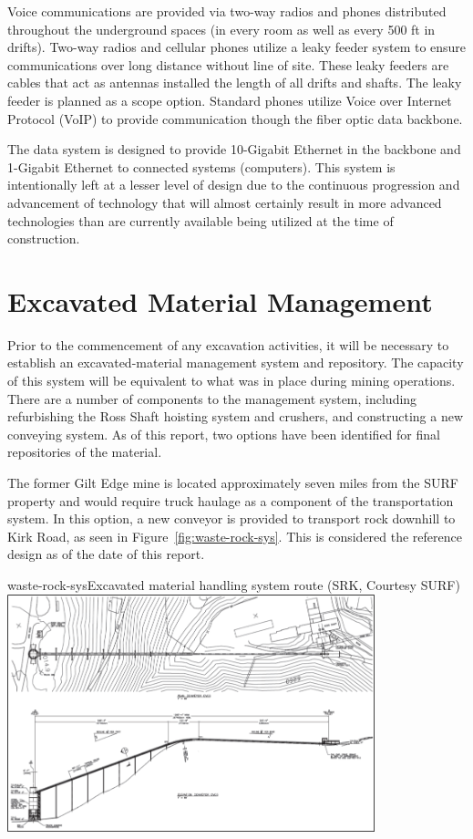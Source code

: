 Voice communications are provided via two-way radios and phones distributed throughout the underground spaces (in every room as well as every 500 ft in drifts). Two-way radios and cellular phones utilize a leaky feeder system to ensure communications over long distance without line of site. These leaky feeders are cables that act as antennas installed the length of all drifts and shafts. The leaky feeder is planned as a scope option.  Standard phones utilize Voice over Internet Protocol (VoIP) to provide communication though the fiber optic data backbone.

The data system is designed to provide 10-Gigabit Ethernet in the backbone and 1-Gigabit Ethernet to connected systems (computers). This system is intentionally left at a lesser level of design due to the continuous progression and advancement of technology that will almost certainly result in more advanced technologies than are currently available being utilized at the time of construction.

\section{Excavated Material Management}
\label{sec:fscf-und-waste-rock}

Prior to the commencement of any excavation activities, it will be necessary to establish an excavated-material management system and repository. The capacity of this system will be equivalent to what was in place during mining operations. 
There are a number of components to the management system, including refurbishing the Ross Shaft hoisting system and %
crushers, and constructing a new conveying system.  As of this report, two options have been identified for final repositories of the material.  

The former Gilt Edge mine is located approximately seven miles from the SURF property and would require truck haulage as a component of the transportation system.  In this option, a new conveyor is provided to transport rock downhill to Kirk Road, as seen in Figure~\ref{fig:waste-rock-sys}. This is considered the reference design as of the date of this report.

\begin{cdrfigure}{waste-rock-sys}{Excavated material  handling system route (SRK, Courtesy SURF)}
\includegraphics[width=0.8\textwidth]{waste-rock-sys}
\end{cdrfigure}

